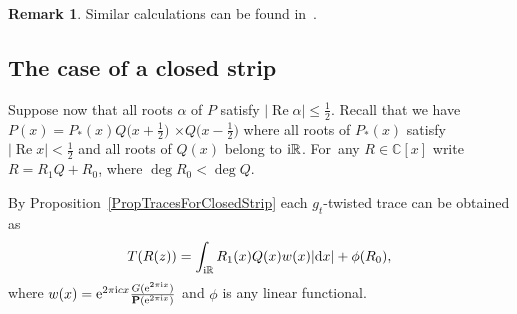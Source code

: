 \documentclass[10pt,a4paper]{amsart}
\newcommand{\RN}{\mathbb{R}} %
\newcommand{\CN}{\mathbb{C}} %
\renewcommand{\Re}{\operatorname{Re}}
\newcommand{\bP}{\mathbf{P}}
\theoremstyle{definition}
\newtheorem{Remark}[Theorem]{Remark}
\numberwithin{equation}{section}
\begin{document}
\begin{Remark} Similar calculations can be found in~\cite[Section~8.1]{DPY}.
\end{Remark}

\subsection{The case of a closed strip}
Suppose now that all roots $\alpha$ of $P$ satisfy $|\Re\alpha|\leq \frac{1}{2}$. Recall that we have $P(x)=P_*(x)Q\big(x+\frac{1}{2}\big)$ $\times Q\big(x-\tfrac{1}{2}\big)$ where all roots of $P_*(x)$ satisfy $|\Re x|<\frac{1}{2}$ and all roots of $Q(x)$ belong to ${\rm i}\RN$. For~any $R\in \CN[x]$ write $R=R_1Q+R_0$, where $\deg R_0<\deg Q$.

By Proposition~\ref{PropTracesForClosedStrip} each $g_t$-twisted trace can be obtained as
\[
T(R(z))=\int_{{\rm i}\RN}R_1(x)Q(x)w(x)|{\rm d}x|+\phi(R_0),
\]
where $w(x)={\rm e}^{2\pi {\rm i} cx}\frac{G({\rm e}^{2\pi {\rm i} x})}{\bP({\rm e}^{2\pi {\rm i}x})}$ and $\phi$ is any linear functional.
\end{document}
